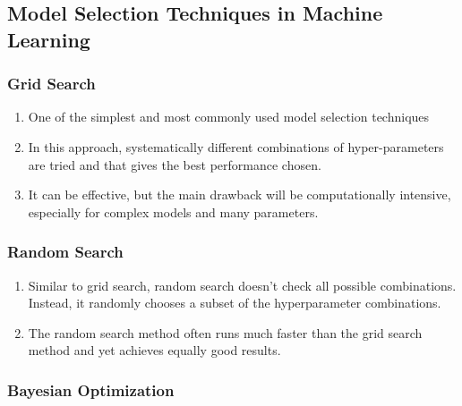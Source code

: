 \subsection{Model Selection Techniques in Machine Learning}

\subsubsection{Grid Search}

\begin{enumerate}
    \item One of the simplest and most commonly used model selection techniques
    \hfill \cite{geeksforgeeks/machine-learning/model-selection-for-machine-learning}

    \item In this approach, systematically different combinations of hyper-parameters are tried and that gives the best performance chosen. 
    \hfill \cite{geeksforgeeks/machine-learning/model-selection-for-machine-learning}
    
    \item It can be effective, but the main drawback will be computationally intensive, especially for complex models and many parameters.
    \hfill \cite{geeksforgeeks/machine-learning/model-selection-for-machine-learning}
\end{enumerate}



\subsubsection{Random Search}

\begin{enumerate}
    \item Similar to grid search, random search doesn't check all possible combinations. Instead, it randomly chooses a subset of the hyperparameter combinations. 
    \hfill \cite{geeksforgeeks/machine-learning/model-selection-for-machine-learning}
    
    \item The random search method often runs much faster than the grid search method and yet achieves equally good results.
    \hfill \cite{geeksforgeeks/machine-learning/model-selection-for-machine-learning}
\end{enumerate}



\subsubsection{Bayesian Optimization}

